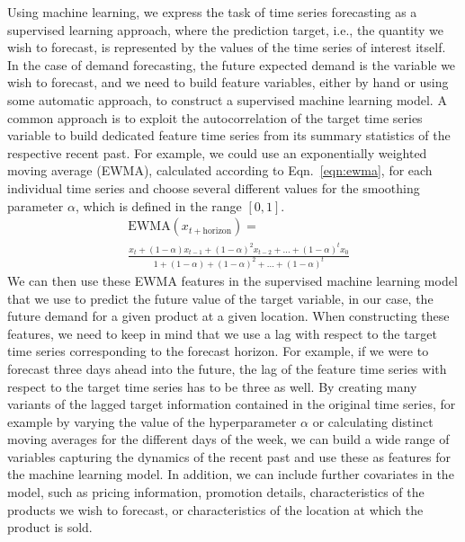 \documentclass[BCOR=1mm, DIV=calc,10pt,
twoside=true,
twocolumn,
headings=normal]{scrartcl}
\newcommand{\eqn}{Eqn.~}
\begin{document}
Using machine learning, we express the task of time series forecasting as a supervised learning approach, where the prediction target, i.e., the quantity we wish to forecast, is represented by the values of the time series of interest itself. In the case of demand forecasting, the future expected demand is the variable we wish to forecast, and we need to build feature variables, either by hand or using some automatic approach, to construct a supervised machine learning model. A common approach is to exploit the autocorrelation of the target time series variable to build dedicated feature time series from its summary statistics of the respective recent past. For example, we could use an exponentially weighted moving average (EWMA), calculated according to \eqn \eqref{eqn:ewma}, for each individual time series and choose several different values for the smoothing parameter $\alpha$, which is defined in the range $[0, 1]$.
\begin{equation} \label{eqn:ewma}
\begin{split}
&\mathrm{EWMA}(x_{t+\mathrm{horizon}}) = \\ &\frac{x_t + (1 - \alpha) x_{t-1} + (1 - \alpha)^2 x_{t-2} + ... + (1 - \alpha)^t x_0}{1 + (1 - \alpha) + (1 - \alpha)^2 + ... + (1 - \alpha)^t}
\end{split}
\end{equation}
We can then use these EWMA features in the supervised machine learning model that we use to predict the future value of the target variable, in our case, the future demand for a given product at a given location. When constructing these features, we need to keep in mind that we use a lag with respect to the target time series corresponding to the forecast horizon. For example, if we were to forecast three days ahead into the future, the lag of the feature time series with respect to the target time series has to be three as well. By creating many variants of the lagged target information contained in the original time series, for example by varying the value of the hyperparameter $\alpha$ or calculating distinct moving averages for the different days of the week, we can build a wide range of variables capturing the dynamics of the recent past and use these as features for the machine learning model. In addition, we can include further covariates in the model, such as pricing information, promotion details, characteristics of the products we wish to forecast, or characteristics of the location at which the product is sold.
\end{document}
